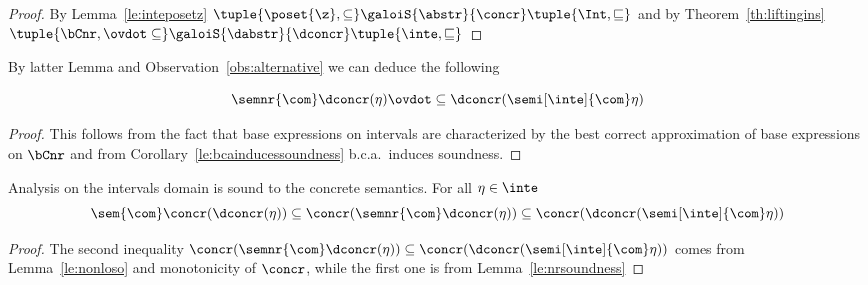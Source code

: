 \begin{proof}
  By Lemma~\ref{le:inteposetz}
  \(\tuple{\poset{\z}, \subseteq} \galoiS{\abstr}{\concr} \tuple{\Int,
    \sqsubseteq}\) and by Theorem~\ref{th:liftingins}
  \(\tuple{\bCnr, \ovdot\subseteq} \galoiS{\dabstr}{\dconcr}
  \tuple{\inte, \sqsubseteq}\)
\end{proof}

By latter Lemma and Observation~\ref{obs:alternative} we can deduce
the following

\begin{lemma}\label{le:nonloso}
  \begin{equation*}
    \semnr{\com}\dconcr(\eta) \ovdot\subseteq \dconcr(\semi[\inte]{\com}\eta)
  \end{equation*}
\end{lemma}

\begin{proof}
  This follows from the fact that base expressions on intervals are
  characterized by the best correct approximation of base expressions
  on \(\bCnr\) and from Corollary~\ref{le:bcainducessoundness} b.c.a.\
  induces soundness.
\end{proof}

\begin{observation}
  Analysis on the intervals domain is sound to the concrete
  semantics. For all \(\eta\in\inte\)
  \begin{equation*}
    \sem{\com}\concr(\dconcr(\eta)) \subseteq \concr(\semnr{\com}\dconcr(\eta)) \subseteq \concr(\dconcr(\semi[\inte]{\com}\eta))
  \end{equation*}
\end{observation}

\begin{proof}
  The second inequality
  \(\concr(\semnr{\com}\dconcr(\eta)) \subseteq
  \concr(\dconcr(\semi[\inte]{\com}\eta))\) comes from
  Lemma~\ref{le:nonloso} and monotonicity of \(\concr\), while the
  first one is from Lemma~\ref{le:nrsoundness}
\end{proof}
  
